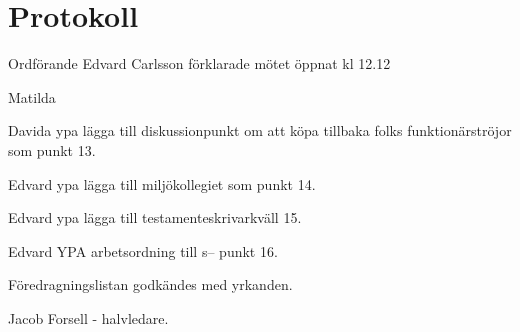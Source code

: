 \documentclass[10pt]{article}
\def\mo{Edvard Carlsson}
\begin{document}
\section*{Protokoll}
\begin{paragrafer}
Ordförande {\mo} förklarade mötet öppnat kl 12.12

{\valavmo}

{\valavms}

{\valavj}

{\tosg}

Matilda 






Davida ypa lägga till diskussionpunkt om att köpa tillbaka folks funktionärströjor som punkt 13.

Edvard ypa lägga till miljökollegiet som punkt 14.

Edvard ypa lägga till testamenteskrivarkväll  15. 

Edvard YPA arbetsordning till s-- punkt 16. 

Föredragningslistan godkändes med yrkanden.

\textit{\ingaprot}

\begin{fyllnadsval} %
Jacob Forsell - halvledare. 



\end{fyllnadsval}
\end{paragrafer}
\end{document}
